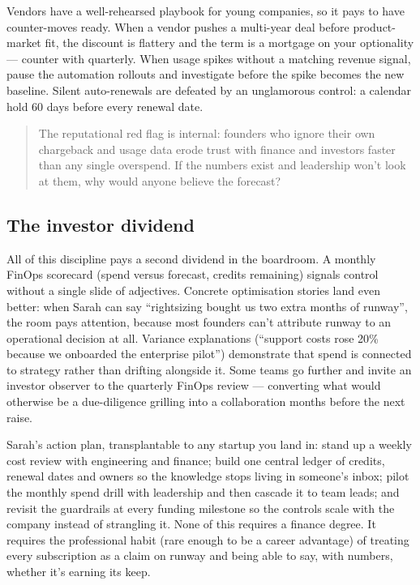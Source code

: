 Vendors have a well-rehearsed playbook for young companies, so it pays to have counter-moves ready. When a vendor pushes a multi-year deal before product-market fit, the discount is flattery and the term is a mortgage on your optionality — counter with quarterly. When usage spikes without a matching revenue signal, pause the automation rollouts and investigate before the spike becomes the new baseline. Silent auto-renewals are defeated by an unglamorous control: a calendar hold 60 days before every renewal date.



\begin{quote}\small
The reputational red flag is internal: founders who ignore their own chargeback and usage data erode trust with finance and investors faster than any single overspend. If the numbers exist and leadership won't look at them, why would anyone believe the forecast?
\end{quote}



\subsection{The investor dividend}


All of this discipline pays a second dividend in the boardroom. A monthly FinOps scorecard (spend versus forecast, credits remaining) signals control without a single slide of adjectives. Concrete optimisation stories land even better: when Sarah can say ``rightsizing bought us two extra months of runway'', the room pays attention, because most founders can't attribute runway to an operational decision at all. Variance explanations (``support costs rose 20\% because we onboarded the enterprise pilot'') demonstrate that spend is connected to strategy rather than drifting alongside it. Some teams go further and invite an investor observer to the quarterly FinOps review — converting what would otherwise be a due-diligence grilling into a collaboration months before the next raise.


Sarah's action plan, transplantable to any startup you land in: stand up a weekly cost review with engineering and finance; build one central ledger of credits, renewal dates and owners so the knowledge stops living in someone's inbox; pilot the monthly spend drill with leadership and then cascade it to team leads; and revisit the guardrails at every funding milestone so the controls scale with the company instead of strangling it. None of this requires a finance degree. It requires the professional habit (rare enough to be a career advantage) of treating every subscription as a claim on runway and being able to say, with numbers, whether it's earning its keep.

